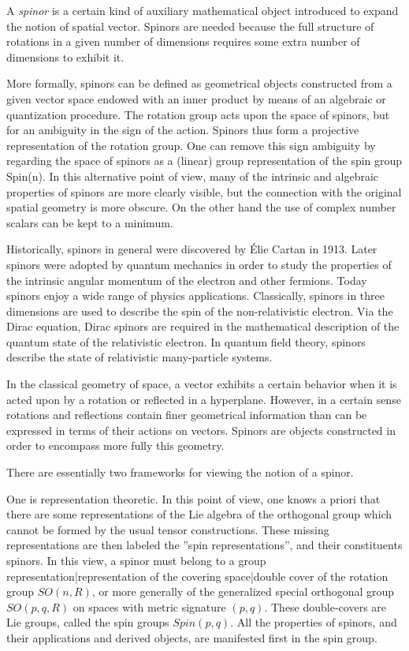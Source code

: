 \documentclass[12pt]{article}
\begin{document}
A {\em spinor} is a certain kind of auxiliary mathematical object introduced to expand the notion of spatial vector. Spinors are needed because the full structure of rotations in a given number of dimensions requires some extra number of dimensions to exhibit it.

More formally, spinors can be defined as geometrical objects constructed from a given vector space endowed with an inner product by means of an algebraic or quantization procedure. The rotation group acts upon the space of spinors, but for an ambiguity in the sign of the action. Spinors thus form a projective representation of the rotation group. One can remove this sign ambiguity by regarding the space of spinors as a (linear) group representation of the spin group Spin(n). In this alternative point of view, many of the intrinsic and algebraic properties of spinors are more clearly visible, but the connection with the original spatial geometry is more obscure. On the other hand the use of complex number scalars can be kept to a minimum.

Historically, spinors in general were discovered by \'Elie Cartan in 1913. Later spinors were adopted by quantum mechanics in order to study the properties of the intrinsic angular momentum of the electron and other fermions. Today spinors enjoy a wide range of physics applications. Classically, spinors in three dimensions are used to describe the spin of the non-relativistic electron. Via the Dirac equation, Dirac spinors are required in the mathematical description of the quantum state of the relativistic electron. In quantum field theory, spinors describe the state of relativistic many-particle systems.

In the classical geometry of space, a vector exhibits a certain behavior when it is acted upon by a rotation or reflected in a hyperplane. However, in a certain sense rotations and reflections contain finer geometrical information than can be expressed in terms of their actions on vectors. Spinors are objects constructed in order to encompass more fully this geometry.

There are essentially two frameworks for viewing the notion of a spinor. 

One is representation theoretic. In this point of view, one knows a priori that there are some representations of the Lie algebra of the orthogonal group which cannot be formed by the usual tensor constructions. These missing representations are then labeled the ''spin representations'', and their constituents spinors. In this view, a spinor must belong to a group representation|representation of the covering space|double cover of the rotation group $SO(n, R)$, or more generally of the generalized special orthogonal group $SO(p, q, R)$ on spaces with metric signature $(p, q)$. These double-covers are Lie groups, called the spin groups $Spin(p, q)$. All the properties of spinors, and their applications and derived objects, are manifested first in the spin group.
\end{document}
